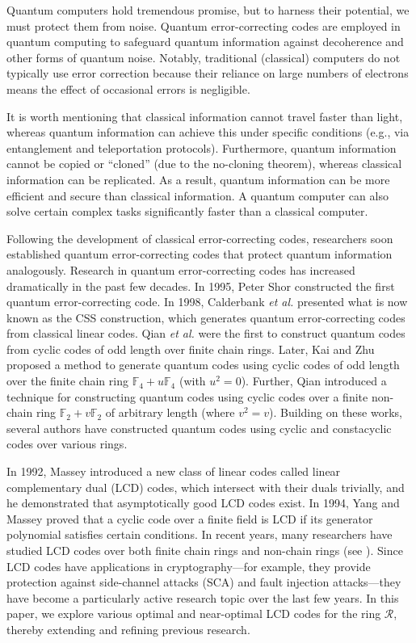 \documentclass[12pt]{article}
\begin{document}
Quantum computers hold tremendous promise, but to harness their potential, we must protect them from noise. Quantum error-correcting codes are employed in quantum computing to safeguard quantum information against decoherence and other forms of quantum noise. Notably, traditional (classical) computers do not typically use error correction because their reliance on large numbers of electrons means the effect of occasional errors is negligible.

It is worth mentioning that classical information cannot travel faster than light, whereas quantum information can achieve this under specific conditions (e.g., via entanglement and teleportation protocols). Furthermore, quantum information cannot be copied or ``cloned'' (due to the no-cloning theorem), whereas classical information can be replicated. As a result, quantum information can be more efficient and secure than classical information. A quantum computer can also solve certain complex tasks significantly faster than a classical computer.

Following the development of classical error-correcting codes, researchers soon established quantum error-correcting codes that protect quantum information analogously. Research in quantum error-correcting codes has increased dramatically in the past few decades. In 1995, Peter Shor \cite{25} constructed the first quantum error-correcting code. In 1998, Calderbank \textit{et al.} \cite{4} presented what is now known as the CSS construction, which generates quantum error-correcting codes from classical linear codes. Qian \textit{et al.} \cite{17} were the first to construct quantum codes from cyclic codes of odd length over finite chain rings. Later, Kai and Zhu \cite{29} proposed a method to generate quantum codes using cyclic codes of odd length over the finite chain ring $\mathbb{F}_4 + u\mathbb{F}_4$ (with $u^2 = 0$). Further, Qian \cite{18} introduced a technique for constructing quantum codes using cyclic codes over a finite non-chain ring $\mathbb{F}_2 + v\mathbb{F}_2$ of arbitrary length (where $v^2 = v$). Building on these works, several authors \cite{2,12,13,19,20,26} have constructed quantum codes using cyclic and constacyclic codes over various rings.

In 1992, Massey \cite{16} introduced a new class of linear codes called linear complementary dual (LCD) codes, which intersect with their duals trivially, and he demonstrated that asymptotically good LCD codes exist. In 1994, Yang and Massey \cite{28} proved that a cyclic code over a finite field is LCD if its generator polynomial satisfies certain conditions. In recent years, many researchers have studied LCD codes over both finite chain rings and non-chain rings (see \cite{8,10,11,30,31}). Since LCD codes have applications in cryptography---for example, they provide protection against side-channel attacks (SCA) and fault injection attacks---they have become a particularly active research topic over the last few years. In this paper, we explore various optimal and near-optimal LCD codes for the ring $\mathcal{R}$, thereby extending and refining previous research.
\end{document}
